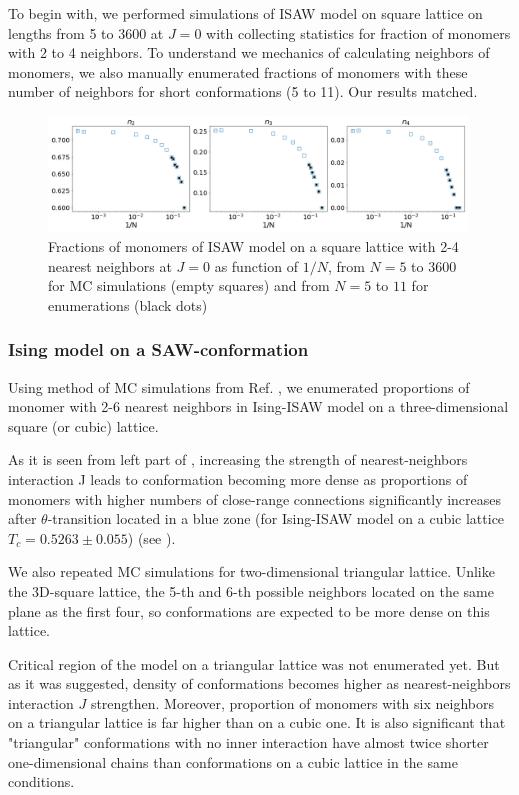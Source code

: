 \documentclass[a4paper]{jpconf}
\begin{document}
To begin with, we performed simulations of ISAW model on square lattice on lengths from 5 to 3600 at $J=0$ with collecting statistics for fraction of monomers with 2 to 4 neighbors. To understand we mechanics of calculating neighbors of monomers, we also manually enumerated fractions of monomers with these number of neighbors for short conformations (5 to 11). Our results matched.

\begin{figure}[h!]
    \centering
    \includegraphics[width=0.99\textwidth]{Images/ISAWJ0_Bulk2-4.png}
    \caption{Fractions of monomers of ISAW model on a square lattice with 2-4 nearest neighbors at $J=0$ as function of $1/N$, from $N = 5$ to $3600$ for MC simulations (empty squares) and from $N = 5$ to $11$ for enumerations (black dots)}
    \label{fig:Ising_vs_ISAW}
\end{figure}

\subsubsection{Ising model on a SAW-conformation}

Using method of MC simulations from Ref. \cite{faizullina2021critical}, we enumerated proportions of monomer with 2-6 nearest neighbors in Ising-ISAW model on a three-dimensional square (or cubic) lattice.

As it is seen from left part of , increasing the strength of nearest-neighbors interaction J leads to conformation becoming more dense as proportions of monomers with higher numbers of close-range connections significantly increases after $\theta$-transition located in a blue zone (for Ising-ISAW model on a cubic lattice $T_{c} = 0.5263 \pm 0.055$\cite{Foster2021}) (see ).

We also repeated MC simulations for two-dimensional triangular lattice. Unlike the 3D-square lattice, the 5-th and 6-th possible neighbors located on the same plane as the first four, so conformations are expected to be more dense on this lattice.

Critical region of the model on a triangular lattice was not enumerated yet. But as it was suggested, density of conformations becomes higher as nearest-neighbors interaction $J$ strengthen. Moreover, proportion of monomers with six neighbors on a triangular lattice is far higher than on a cubic one. It is also significant that "triangular" conformations with no inner interaction have almost twice shorter one-dimensional chains than conformations on a cubic lattice in the same conditions.
\end{document}
